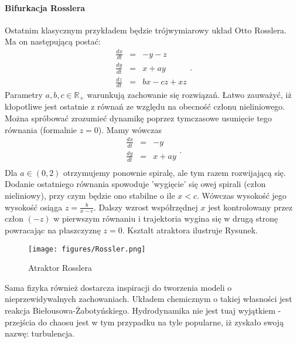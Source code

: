 \documentclass[12pt]{article}
\begin{document}
\paragraph{Bifurkacja Rosslera}
Ostatnim klasycznym przykładem będzie trójwymiarowy układ Otto Rosslera. Ma on następującą postać:
\begin{equation}
\begin{array}{rcl} 
\frac{dx}{dt} & = & -y-z \\
\frac{dy}{dt} & = & x+ay \\
\frac{dz}{dt} & = & bx-cz+xz
\end{array}.
\end{equation}
Parametry $ a,b,c \in \mathbb{R}_{+} $ warunkują zachowanie się rozwiązań. \newline
Łatwo zauważyć, iż kłopotliwe jest ostatnie z równań ze względu na obecność członu nieliniowego. Można spróbować zrozumieć dynamikę poprzez tymczasowe usunięcie tego równania (formalnie $ z = 0 $). Mamy wówczas
\begin{equation}
\begin{array}{rcl} 
\frac{dx}{dt} & = & -y \\
\frac{dy}{dt} & = & x+ay \\
\end{array}.
\end{equation}
Dla $ a \in (0,2) $ otrzymujemy ponownie spiralę, ale tym razem rozwijającą się. Dodanie ostatniego równania spowoduje 'wygięcie' się owej spirali (człon nieliniowy), przy czym będzie ono stabilne o ile $ x<c $. Wówczas wysokość jego wysokość osiąga $ z = \frac{b}{x-c} $. Dalszy wzrost współrzędnej $ x $ jest kontrolowany przez człon $ (-z) $ w pierwszym równaniu i trajektoria wygina się w drugą stronę powracając na płaszczyznę $ z=0 $. Kształt atraktora ilustruje Rysunek.
\begin{figure}[H]
	\texttt{[image: figures/Rossler.png]} 
	\centering
	\caption{Atraktor Rosslera}
\end{figure}
Sama fizyka również dostarcza inspiracji do tworzenia modeli o nieprzewidywalnych zachowaniach. Układem chemicznym o takiej własności jest reakcja Biełousowa-Żabotyńskiego. Hydrodynamika nie jest tuaj wyjątkiem - przejścia do chaosu jest w tym przypadku na tyle popularne, iż zyskało swoją nazwę: turbulencja.
\end{document}

